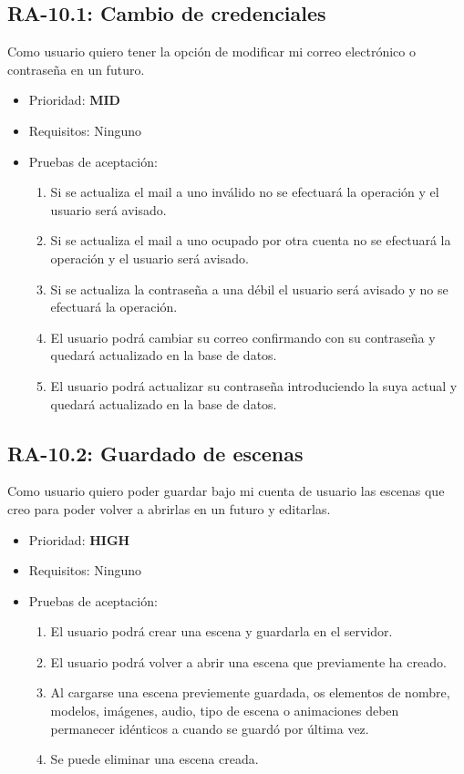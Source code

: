 \subsection{RA-10.1: Cambio de credenciales}
Como usuario quiero tener la opción de modificar mi correo electrónico o contraseña en un futuro.

\begin{itemize}
    \item Prioridad: \textbf{MID}
    \item Requisitos: Ninguno
    \item Pruebas de aceptación:
	\begin{enumerate}
		\item Si se actualiza el mail a uno inválido no se efectuará la operación y el usuario será avisado.
		\item Si se actualiza el mail a uno ocupado por otra cuenta no se efectuará la operación y el usuario será avisado.
		\item Si se actualiza la contraseña a una débil el usuario será avisado y no se efectuará la operación.
		\item El usuario podrá cambiar su correo confirmando con su contraseña y quedará actualizado en la base de datos.
		\item El usuario podrá actualizar su contraseña introduciendo la suya actual y quedará actualizado en la base de datos.
	\end{enumerate}
\end{itemize}

\subsection{RA-10.2: Guardado de escenas}
Como usuario quiero poder guardar bajo mi cuenta de usuario las escenas que creo para poder volver a abrirlas en un futuro y editarlas.

\begin{itemize}
    \item Prioridad: \textbf{HIGH}
    \item Requisitos: Ninguno
    \item Pruebas de aceptación:
	\begin{enumerate}
		\item El usuario podrá crear una escena y guardarla en el servidor.
		\item El usuario podrá volver a abrir una escena que previamente ha creado.
		\item Al cargarse una escena previemente guardada, os elementos de nombre, modelos, imágenes, audio, tipo de escena o animaciones deben permanecer idénticos a cuando se guardó por última vez.
		\item Se puede eliminar una escena creada.
	\end{enumerate}
\end{itemize}

